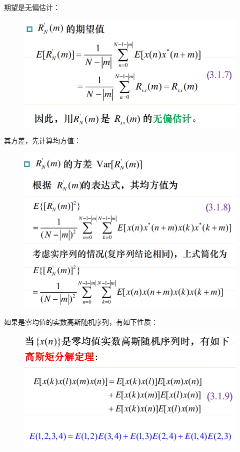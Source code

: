 \documentclass[UTF8]{ctexart} %
\begin{document}
				期望是无偏估计：
				\begin{figure}[H]
					\centering\includegraphics[scale=0.4]{73.png}
				\end{figure}
				其方差，先计算均方值：
				\begin{figure}[H]
					\centering\includegraphics[scale=0.4]{74.png}
				\end{figure}
				如果是零均值的实数高斯随机序列，有如下性质：
				\begin{figure}[H]
					\centering\includegraphics[scale=0.4]{75.png}
				\end{figure}
\end{document}
